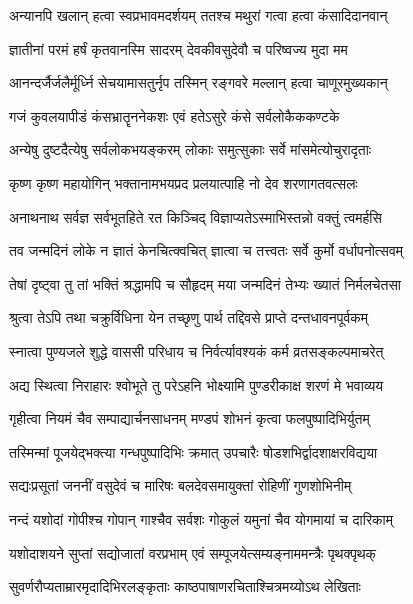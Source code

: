 \twolineshloka
{अन्यानपि खलान् हत्वा स्वप्रभावमदर्शयम्}
{ततश्च मथुरां गत्वा हत्वा कंसादिदानवान्}%

\twolineshloka
{ज्ञातीनां परमं हर्षं कृतवानस्मि सादरम्}
{देवकीवसुदेवौ च परिष्वज्य मुदा मम}%

\twolineshloka
{आनन्दर्जैर्जलैर्मूर्ध्नि सेचयामासतुर्नृप}
{तस्मिन् रङ्गवरे मल्लान् हत्वा चाणूरमुख्यकान्}%

\twolineshloka
{गजं कुवलयापीडं कंसभ्रातॄननेकशः}
{एवं हतेऽसुरे कंसे सर्वलोकैककण्टके}%

\twolineshloka
{अन्येषु दुष्टदैत्येषु सर्वलोकभयङ्करम्}
{लोकाः समुत्सुकाः सर्वे मांसमेत्योचुरादृताः}%

\twolineshloka
{कृष्ण कृष्ण महायोगिन् भक्तानामभयप्रद}
{प्रलयात्पाहि नो देव शरणागतवत्सलः}%

\twolineshloka
{अनाथनाथ सर्वज्ञ सर्वभूतहिते रत}
{किञ्चिद् विज्ञाप्यतेऽस्माभिस्तन्नो वक्तुं त्वमर्हसि}%

\twolineshloka
{तव जन्मदिनं लोके न ज्ञातं केनचित्क्वचित्}
{ज्ञात्वा च तत्त्वतः सर्वे कुर्मो वर्धापनोत्सवम्}%

\twolineshloka
{तेषां दृष्ट्वा तु तां भक्तिं श्रद्धामपि च सौहृदम्}
{मया जन्मदिनं तेभ्यः ख्यातं निर्मलचेतसा}%

\twolineshloka
{श्रुत्वा तेऽपि तथा चक्रुर्विधिना येन तच्छृणु}
{पार्थ तद्दिवसे प्राप्ते दन्तधावनपूर्वकम्}%

\twolineshloka
{स्नात्वा पुण्यजले शुद्धे वाससी परिधाय च}
{निर्वर्त्यावश्यकं कर्म व्रतसङ्कल्पमाचरेत्}%

\twolineshloka
{अद्य स्थित्वा निराहारः श्वोभूते तु परेऽहनि}
{भोक्ष्यामि पुण्डरीकाक्ष शरणं मे भवाव्यय}%

\twolineshloka
{गृहीत्वा नियमं चैव सम्पाद्यार्चनसाधनम्}
{मण्डपं शोभनं कृत्वा फलपुष्पादिभिर्युतम्}%

\twolineshloka
{तस्मिन्मां पूजयेद्भक्त्या गन्धपुष्पादिभिः क्रमात्}
{उपचारैः षोडशभिर्द्वादशाक्षरविद्यया}%

\twolineshloka
{सद्यःप्रसूतां जननीं वसुदेवं च मारिषः}
{बलदेवसमायुक्तां रोहिणीं गुणशोभिनीम्}%

\twolineshloka
{नन्दं यशोदां गोपीश्च गोपान् गाश्चैव सर्वशः}
{गोकुलं यमुनां चैव योगमायां च दारिकाम्}%

\twolineshloka
{यशोदाशयने सुप्तां सद्योजातां वरप्रभाम्}
{एवं सम्पूजयेत्सम्यङ्नाममन्त्रैः पृथक्पृथक्}%

\twolineshloka
{सुवर्णरौप्यताम्रारमृदादिभिरलङ्कृताः}
{काष्ठपाषाणरचिताश्चित्रमय्योऽथ लेखिताः}%

